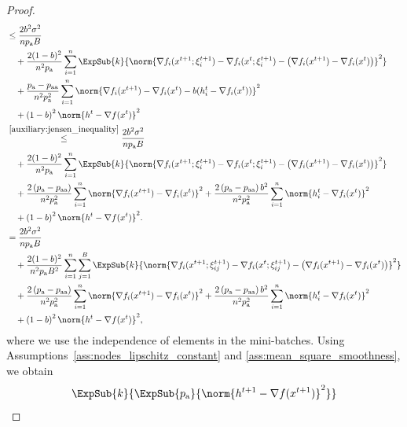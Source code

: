 \documentclass{article}
\newcommand*{\probavailable}{\ensuremath{p_{\textnormal{a}}}}
\newcommand*{\probpairaa}{\ensuremath{p_{\textnormal{aa}}}}
\begin{document}
\begin{proof}
\begin{align*}
    &\leq \frac{2 b^2 \sigma^2}{n \probavailable B}\\
    & \quad + \frac{2 (1 - b)^2}{n^2 \probavailable}\sum_{i=1}^n \ExpSub{k}{\norm{\nabla f_i(x^{t+1};\xi^{t+1}_i) - \nabla f_i(x^{t};\xi^{t+1}_i) - \left(\nabla f_i(x^{t+1}) - \nabla f_i(x^{t})\right)}^2} \\
    &\quad + \frac{\probavailable - \probpairaa}{n^2 \probavailable^2} \sum_{i=1}^n \norm{\nabla f_i(x^{t+1}) - \nabla f_i(x^{t}) - b(h^t_i - \nabla f_i(x^{t}))}^2 \\
    &\quad + \left(1 - b\right)^2 \norm{h^{t} - \nabla f(x^{t})}^2 \\
    &\overset{\eqref{auxiliary:jensen_inequality}}{\leq} \frac{2 b^2 \sigma^2}{n \probavailable B}\\
    & \quad + \frac{2 (1 - b)^2}{n^2 \probavailable}\sum_{i=1}^n \ExpSub{k}{\norm{\nabla f_i(x^{t+1};\xi^{t+1}_i) - \nabla f_i(x^{t};\xi^{t+1}_i) - \left(\nabla f_i(x^{t+1}) - \nabla f_i(x^{t})\right)}^2} \\
    &\quad + \frac{2\left(\probavailable - \probpairaa\right)}{n^2 \probavailable^2} \sum_{i=1}^n \norm{\nabla f_i(x^{t+1}) - \nabla f_i(x^{t})}^2 + \frac{2 \left(\probavailable - \probpairaa\right) b^2}{n^2 \probavailable^2} \sum_{i=1}^n \norm{h^t_i - \nabla f_i(x^{t})}^2 \\
    &\quad + \left(1 - b\right)^2 \norm{h^{t} - \nabla f(x^{t})}^2. \\
    &= \frac{2 b^2 \sigma^2}{n \probavailable B}\\
    & \quad + \frac{2 (1 - b)^2}{n^2 \probavailable B^2}\sum_{i=1}^n \sum_{j=1}^B \ExpSub{k}{\norm{\nabla f_i(x^{t+1};\xi^{t+1}_{ij}) - \nabla f_i(x^{t};\xi^{t+1}_{ij}) - \left(\nabla f_i(x^{t+1}) - \nabla f_i(x^{t})\right)}^2} \\
    &\quad + \frac{2\left(\probavailable - \probpairaa\right)}{n^2 \probavailable^2} \sum_{i=1}^n \norm{\nabla f_i(x^{t+1}) - \nabla f_i(x^{t})}^2 + \frac{2 \left(\probavailable - \probpairaa\right) b^2}{n^2 \probavailable^2} \sum_{i=1}^n \norm{h^t_i - \nabla f_i(x^{t})}^2 \\
    &\quad + \left(1 - b\right)^2 \norm{h^{t} - \nabla f(x^{t})}^2, \\
  \end{align*}
  where we use the independence of elements in the mini-batches.
  Using Assumptions~\ref{ass:nodes_lipschitz_constant} and \ref{ass:mean_square_smoothness}, we obtain
  \begin{align*}
    &\ExpSub{k}{\ExpSub{\probavailable}{\norm{h^{t+1} - \nabla f(x^{t+1})}^2}} \\

\end{align*}
\end{proof}
\end{document}
